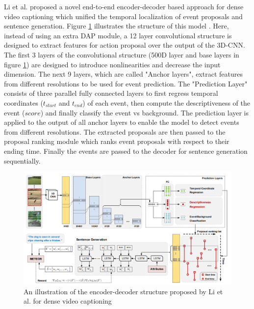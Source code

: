 \documentclass[preprint, 10pt]{elsarticle}
\begin{document}
		Li et al. \cite{li2018jointly} proposed a novel end-to-end encoder-decoder based approach for dense video captioning which unified the temporal localization of event proposals and sentence generation\cite{li2018jointly}. Figure \ref{fig:dense2} illustrates the structure of this model \cite{li2018jointly}. Here, instead of using an extra DAP module, a 12 layer convolutional structure is designed to extract features for action proposal over the output of the 3D-CNN. The first 3 layers of the convolutional structure (500D layer and base layers in figure \ref{fig:dense2}) are designed to introduce nonlinearities and decrease the input dimension. The next 9 layers, which are called "Anchor layers", extract features from different resolutions to be used for event prediction. The "Prediction Layer" consists of three parallel fully connected layers to first regress temporal coordinates ($t_{start}$ and $t_{end}$) of each event, then compute the descriptiveness of the event ($score$) and finally classify the event vs background. The prediction layer is applied to the output of all anchor layers to enable the model to detect events from different resolutions. The extracted proposals are then passed to the proposal ranking module which ranks event proposals with respect to their ending time. Finally the events are passed to the decoder for sentence generation sequentially.
		
		\begin{figure}[h]
			\centering
			\includegraphics[scale=0.5]{Imgs/dense2.png}
			\caption{An illustration of the encoder-decoder structure proposed by Li et al. for dense video captioning \cite{li2018jointly}}
			\label{fig:dense2}
		\end{figure}
	
\end{document}
